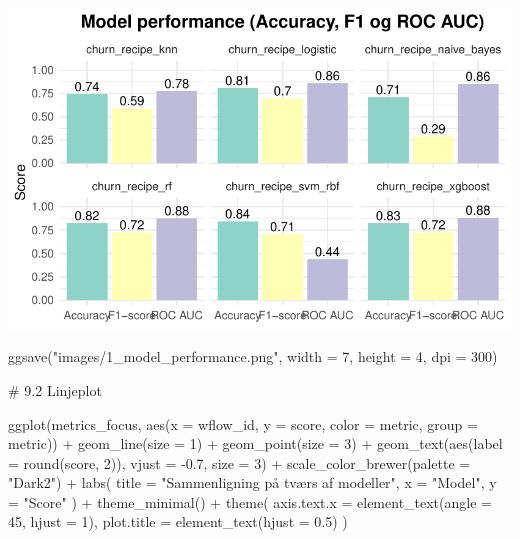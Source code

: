 \documentclass[
  11pt,
  letterpaper,
  DIV=11,
  numbers=noendperiod]{scrartcl}
\newenvironment{Shaded}{\begin{snugshade}}{\end{snugshade}}
\newcommand{\AttributeTok}[1]{\textcolor[rgb]{0.40,0.45,0.13}{#1}}
\newcommand{\CommentTok}[1]{\textcolor[rgb]{0.37,0.37,0.37}{#1}}
\newcommand{\DecValTok}[1]{\textcolor[rgb]{0.68,0.00,0.00}{#1}}
\newcommand{\FloatTok}[1]{\textcolor[rgb]{0.68,0.00,0.00}{#1}}
\newcommand{\FunctionTok}[1]{\textcolor[rgb]{0.28,0.35,0.67}{#1}}
\newcommand{\NormalTok}[1]{\textcolor[rgb]{0.00,0.23,0.31}{#1}}
\newcommand{\SpecialCharTok}[1]{\textcolor[rgb]{0.37,0.37,0.37}{#1}}
\newcommand{\StringTok}[1]{\textcolor[rgb]{0.13,0.47,0.30}{#1}}
\begin{document}
\includegraphics{Quarto_files/figure-pdf/unnamed-chunk-12-1.pdf}

\begin{Shaded}
\begin{Highlighting}[]
\FunctionTok{ggsave}\NormalTok{(}\StringTok{"images/1\_model\_performance.png"}\NormalTok{, }\AttributeTok{width =} \DecValTok{7}\NormalTok{, }\AttributeTok{height =} \DecValTok{4}\NormalTok{, }\AttributeTok{dpi =} \DecValTok{300}\NormalTok{)}


\CommentTok{\# 9.2 Linjeplot}


\FunctionTok{ggplot}\NormalTok{(metrics\_focus, }\FunctionTok{aes}\NormalTok{(}\AttributeTok{x =}\NormalTok{ wflow\_id, }\AttributeTok{y =}\NormalTok{ score, }\AttributeTok{color =}\NormalTok{ metric, }\AttributeTok{group =}\NormalTok{ metric)) }\SpecialCharTok{+}
  \FunctionTok{geom\_line}\NormalTok{(}\AttributeTok{size =} \DecValTok{1}\NormalTok{) }\SpecialCharTok{+}
  \FunctionTok{geom\_point}\NormalTok{(}\AttributeTok{size =} \DecValTok{3}\NormalTok{) }\SpecialCharTok{+}
  \FunctionTok{geom\_text}\NormalTok{(}\FunctionTok{aes}\NormalTok{(}\AttributeTok{label =} \FunctionTok{round}\NormalTok{(score, }\DecValTok{2}\NormalTok{)), }\AttributeTok{vjust =} \SpecialCharTok{{-}}\FloatTok{0.7}\NormalTok{, }\AttributeTok{size =} \DecValTok{3}\NormalTok{) }\SpecialCharTok{+}
  \FunctionTok{scale\_color\_brewer}\NormalTok{(}\AttributeTok{palette =} \StringTok{"Dark2"}\NormalTok{) }\SpecialCharTok{+}
  \FunctionTok{labs}\NormalTok{(}
    \AttributeTok{title =} \StringTok{"Sammenligning på tværs af modeller"}\NormalTok{,}
    \AttributeTok{x =} \StringTok{"Model"}\NormalTok{,}
    \AttributeTok{y =} \StringTok{"Score"}
\NormalTok{  ) }\SpecialCharTok{+}
  \FunctionTok{theme\_minimal}\NormalTok{() }\SpecialCharTok{+}
  \FunctionTok{theme}\NormalTok{(}
    \AttributeTok{axis.text.x =} \FunctionTok{element\_text}\NormalTok{(}\AttributeTok{angle =} \DecValTok{45}\NormalTok{, }\AttributeTok{hjust =} \DecValTok{1}\NormalTok{),}
    \AttributeTok{plot.title =} \FunctionTok{element\_text}\NormalTok{(}\AttributeTok{hjust =} \FloatTok{0.5}\NormalTok{)}
\NormalTok{  )}
\end{Highlighting}
\end{Shaded}
\end{document}
